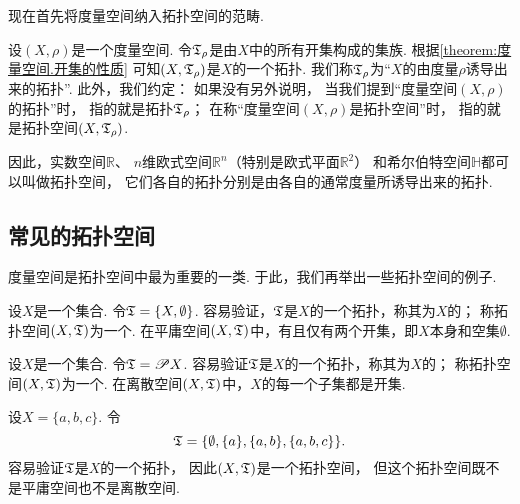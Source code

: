 现在首先将度量空间纳入拓扑空间的范畴.

设\((X,\rho)\)是一个度量空间.
令\(\mathfrak T_\rho\)是由\(X\)中的所有开集构成的集族.
根据\cref{theorem:度量空间.开集的性质} 可知\((X,\mathfrak T_\rho)\)是\(X\)的一个拓扑.
我们称\(\mathfrak T_\rho\)为“\(X\)的由度量\(\rho\)诱导出来的拓扑”.
此外，我们约定：
如果没有另外说明，
当我们提到“度量空间\((X,\rho)\)的拓扑”时，
指的就是拓扑\(\mathfrak T_\rho\)；
在称“度量空间\((X,\rho)\)是拓扑空间”时，
指的就是拓扑空间\((X,\mathfrak T_\rho)\).

因此，实数空间\(\mathbb{R}\)、
\(n\)维欧式空间\(\mathbb{R}^n\)（特别是欧式平面\(\mathbb{R}^2\)）
和希尔伯特空间\(\mathbb{H}\)都可以叫做拓扑空间，
它们各自的拓扑分别是由各自的通常度量所诱导出来的拓扑.

\subsection{常见的拓扑空间}
度量空间是拓扑空间中最为重要的一类.
于此，我们再举出一些拓扑空间的例子.

\begin{example}[平庸空间]
设\(X\)是一个集合.
令\(\mathfrak T=\{X,\emptyset\}\).
容易验证，\(\mathfrak T\)是\(X\)的一个拓扑，称其为\(X\)的；
称拓扑空间\((X,\mathfrak T)\)为一个.
在平庸空间\((X,\mathfrak T)\)中，有且仅有两个开集，即\(X\)本身和空集\(\emptyset\).
\end{example}

\begin{example}[离散空间]
设\(X\)是一个集合.
令\(\mathfrak T=\mathscr{P} X\).
容易验证\(\mathfrak T\)是\(X\)的一个拓扑，称其为\(X\)的；
称拓扑空间\((X,\mathfrak T)\)为一个.
在离散空间\((X,\mathfrak T)\)中，\(X\)的每一个子集都是开集.
\end{example}

\begin{example}\label{example:拓扑学.常见的拓扑空间3}
设\(X = \{a,b,c\}\).
令\[
	\mathfrak T = \{
		\emptyset,
		\{a\},
		\{a,b\},
		\{a,b,c\}
	\}.
\]
容易验证\(\mathfrak T\)是\(X\)的一个拓扑，
因此\((X,\mathfrak T)\)是一个拓扑空间，
但这个拓扑空间既不是平庸空间也不是离散空间.
\end{example}


